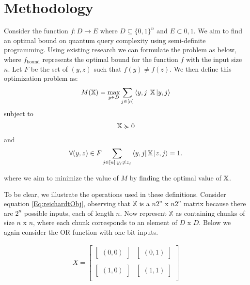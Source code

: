 \section{Methodology}

Consider the function $f: D \rightarrow E$ where $D
\subseteq {\{0,1\}}^n$ and $E \subset {0,1}$. We aim to find an
optimal bound on quantum query complexity using semi-definite
programming. Using existing research
\cite{reichardt2009span} we can formulate the problem as below, where
$f_{\text{bound}}$ represents the optimal bound for the function
$f$ with the input size $n$.
Let $F$ be the set of $(y,z)$ such that $f(y) \neq f(z)$.
We then define this optimization problem as:
\begin{align} \label{Eq:reichardtObj}
    M(\operatorname{\mathbb{X}}) = \max_{y \in D} \sum_{j \in [n]}
    \bra{y,j}\operatorname{\mathbb{X}}\ket{y,j} 
\end{align}
subject to
\begin{align}\label{Eq:semi1}
    \operatorname{\mathbb{X}} \succcurlyeq 0 
\end{align}
and
\begin{align}\label{Eq:off-diag}
    \forall (y,z) \in F \sum_{j \in [n]: y_j \ne z_j} 
    \bra{y,j} \operatorname{\mathbb{X}} \ket{z, j} = 1.  
\end{align}

where we aim to minimize the value of $M$ by finding the optimal value of $\operatorname{\mathbb{X}}$.

To be clear, we illustrate the operations used in these definitions. Consider equation \cref{Eq:reichardtObj}, observing that $\mathbb{X}$ is a $n2^n$ x $n2^n$ matrix because there are $2^n$ possible inputs, each of length $n$. Now represent $\mathbb{X}$ as containing chunks of size $n$ x $n$, where each chunk corresponds to an element of $D$ x $D$. Below we again consider the OR function with one bit inputs.

\begin{align}
   X = \left[ \begin{matrix}
   \left[ \begin{matrix} (0,0)\end{matrix} \right] & \left[
   \begin{matrix} (0,1)\end{matrix} \right] \\ \\
   \left[ \begin{matrix} (1,0)\end{matrix} \right] & \left[
   \begin{matrix} (1,1)\end{matrix} \right] \\
    \end{matrix} \right]
\end{align}

